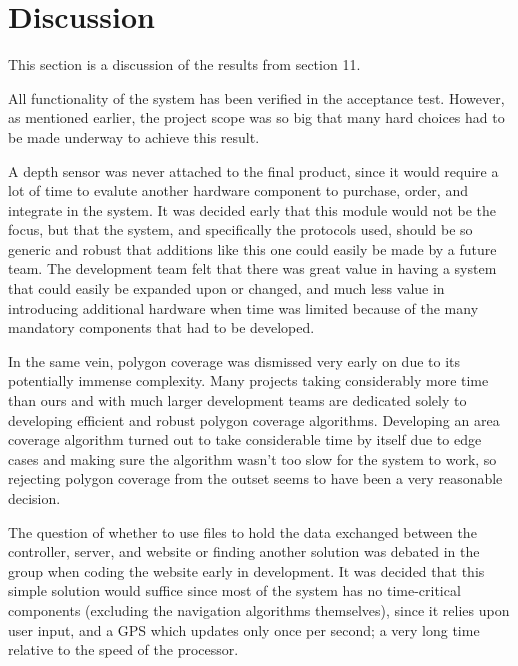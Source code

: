 \newpage
\chapter{Discussion}
This section is a discussion of the results from section 11. 

All functionality of the system has been verified in the acceptance test. However, as mentioned earlier, the project scope was so big that many hard choices had to be made underway to achieve this result.

A depth sensor was never attached to the final product, since it would require a lot of time to evalute another hardware component to purchase, order, and integrate in the system. It was decided early that this module would not be the focus, but that the system, and specifically the protocols used, should be so generic and robust that additions like this one could easily be made by a future team. The development team felt that there was great value in having a system that could easily be expanded upon or changed, and much less value in introducing additional hardware when time was limited because of the many mandatory components that had to be developed. 

In the same vein, polygon coverage was dismissed very early on due to its potentially immense complexity. Many projects taking considerably more time than ours and with much larger development teams are dedicated solely to developing efficient and robust polygon coverage algorithms. Developing an area coverage algorithm turned out to take considerable time by itself due to edge cases and making sure the algorithm wasn't too slow for the system to work, so rejecting polygon coverage from the outset seems to have been a very reasonable decision.

The question of whether to use files to hold the data exchanged between the controller, server, and website or finding another solution was debated in the group when coding the website early in development. It was decided that this simple solution would suffice since most of the system has no time-critical components (excluding the navigation algorithms themselves), since it relies upon user input, and a GPS which updates only once per second; a very long time relative to the speed of the processor. 

